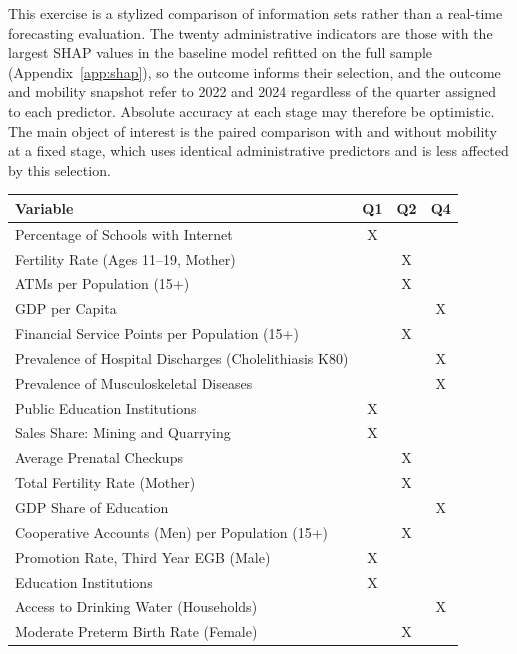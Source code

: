 \documentclass[pdflatex,sn-apa]{sn-jnl}
\begin{document}
This exercise is a stylized comparison of information sets rather than a real-time forecasting evaluation. The twenty administrative indicators are those with the largest SHAP values in the baseline model refitted on the full sample (Appendix~\ref{app:shap}), so the outcome informs their selection, and the outcome and mobility snapshot refer to 2022 and 2024 regardless of the quarter assigned to each predictor. Absolute accuracy at each stage may therefore be optimistic. The main object of interest is the paired comparison with and without mobility at a fixed stage, which uses identical administrative predictors and is less affected by this selection.


\begin{table}[!htbp]
    \centering
    \footnotesize
    \renewcommand{\arraystretch}{1.05}
    \begin{tabular}{p{}ccc}
        \toprule
        \textbf{Variable} & \textbf{Q1} & \textbf{Q2} & \textbf{Q4} \\ \midrule
        Percentage of Schools with Internet & X &  &  \\
        Fertility Rate (Ages 11--19, Mother) &  & X &  \\
        ATMs per Population (15+) &  & X &  \\
        GDP per Capita &  &  & X \\
        Financial Service Points per Population (15+) &  & X &  \\
        Prevalence of Hospital Discharges (Cholelithiasis K80) &  &  & X \\
        Prevalence of Musculoskeletal Diseases &  &  & X \\
        Public Education Institutions & X &  &  \\
        Sales Share: Mining and Quarrying & X &  &  \\
        Average Prenatal Checkups &  & X &  \\
        Total Fertility Rate (Mother) &  & X &  \\
        GDP Share of Education &  &  & X \\
        Cooperative Accounts (Men) per Population (15+) &  & X &  \\
        Promotion Rate, Third Year EGB (Male) & X &  &  \\
        Education Institutions & X &  &  \\
        Access to Drinking Water (Households) &  &  & X \\
        Moderate Preterm Birth Rate (Female) &  & X &  \\

\end{tabular}
\end{table}
\end{document}
